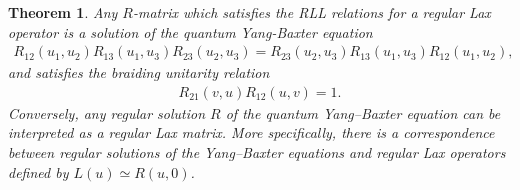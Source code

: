 \documentclass{article}
\newtheorem{thm}{Theorem}
\begin{document}
\begin{thm}
\label{thm}
Any $R$-matrix which satisfies the RLL relations for a regular Lax operator is a solution of the quantum Yang-Baxter equation
%
\begin{align}
R_{12}(u_1,u_2) R_{13}(u_1,u_3) R_{23}(u_2,u_3) = R_{23}(u_2,u_3) R_{13} (u_1,u_3)R_{12}(u_1,u_2),
\end{align}
%
and satisfies the braiding unitarity relation
%
\begin{align}\label{eq:Braiding}
R_{21}(v,u) R_{12}(u,v) = 1. 
\end{align}
%
Conversely, any regular solution $R$ of the quantum Yang--Baxter equation can be interpreted as a regular Lax matrix. More specifically, there is a correspondence between regular solutions of the Yang--Baxter equations and regular Lax operators defined by $L(u) \simeq R(u,0)$.
\end{thm}
\end{document}

